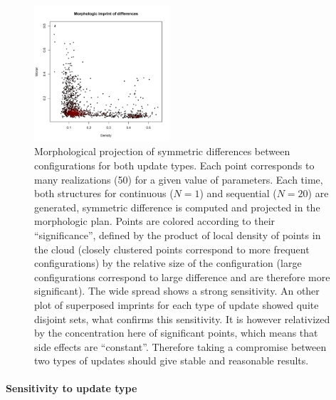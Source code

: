 \documentclass[a4paper,twocolumn,twoside,10pt]{article}
\begin{document}
\begin{figure}[htp]
\centering
\includegraphics[width=0.45\textwidth]{figures/diffImprint}
\caption{Morphological projection of symmetric
differences between configurations for both update types.
Each point corresponds to many realizations (50) for a given value
of parameters. Each time, both structures for continuous ($N=1$)
and sequential ($N=20$) are generated, symmetric difference is computed
and projected in the morphologic plan. Points are colored according
to their ``significance'', defined by the product of local density
of points in the cloud (closely clustered points correspond to more
frequent configurations) by the relative size of the configuration
(large configurations correspond to large difference and are therefore
more significant). The wide spread shows a strong sensitivity. An
other plot of superposed imprints for each type of update showed quite
disjoint sets, what confirms this sensitivity. It is however relativized
by the concentration here of significant points, which means that
side effects are ``constant''. Therefore taking a compromise between
two types of updates should give stable and reasonable results.}

\label{fig5}

\end{figure}



\paragraph{Sensitivity to update type}
\end{document}

